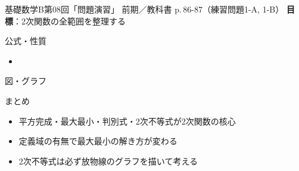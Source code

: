 \documentclass[aspectratio=43,professionalfonts,handout]{beamer}
\newcommand{\LectureNum}{08}
\newcommand{\LectureTitle}{問題演習}
\newcommand{\TextPages}{p.\,86-87（練習問題1-A, 1-B）}
\newcommand{\CourseName}{基礎数学B}
\renewcommand{\TermName}{前期}
\begin{document}
\begin{frame}{\CourseName\quad 第\LectureNum 回「\LectureTitle 」}
  {\small \TermName\quad \TeacherName\quad ／\quad 教科書 \TextPages\quad
  \textbf{目標}：2次関数の全範囲を整理する}

\end{frame}

\begin{frame}{公式・性質}
  \begin{block}{}
  \begin{itemize}
    \item %
  \end{itemize}
  \end{block}
\end{frame}

\begin{frame}{図・グラフ}
  \centering
\end{frame}

\begin{frame}{まとめ}
  \begin{itemize}
    \item 平方完成・最大最小・判別式・2次不等式が2次関数の核心
    \item 定義域の有無で最大最小の解き方が変わる
    \item 2次不等式は必ず放物線のグラフを描いて考える
  \end{itemize}
\end{frame}
\end{document}
